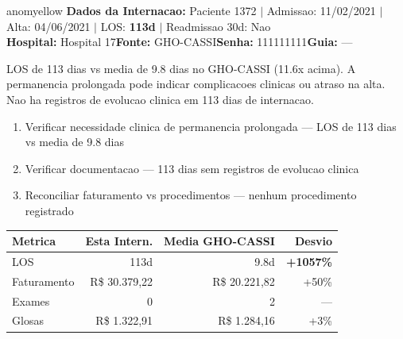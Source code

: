 \documentclass[a4paper,10pt]{article}
\begin{document}
\newpage

\begin{anomalycard}[Internacao 1164 | GHO-CASSI | MODERADO (z=2.21)]{anomyellow}
\textbf{Dados da Internacao:} Paciente 1372 $\mid$ Admissao: 11/02/2021 $\mid$ Alta: 04/06/2021 $\mid$ LOS: \textbf{113d} $\mid$ Readmissao 30d: Nao\\
\textbf{Hospital:} Hospital 17\quad\textbf{Fonte:} GHO-CASSI\quad\textbf{Senha:} 111111111\quad\textbf{Guia:} ---\\
\vspace{2pt}\begin{tcolorbox}[colback=severityred!20,colframe=anomyellow,title={\textbf{Interpretacao de Negocio}},fonttitle=\bfseries\small,left=4pt,right=4pt,top=3pt,bottom=3pt]
{\small LOS de 113 dias vs media de 9.8 dias no GHO-CASSI (11.6x acima). A permanencia prolongada pode indicar complicacoes clinicas ou atraso na alta. Nao ha registros de evolucao clinica em 113 dias de internacao.}
\end{tcolorbox}
\begin{tcolorbox}[colback=severityyellow!30,colframe=anomorange,title={\textbf{Recomendacoes Especificas}},fonttitle=\bfseries\small,left=4pt,right=4pt,top=3pt,bottom=3pt]
\begin{enumerate}[nosep,leftmargin=16pt]
\item {\small Verificar necessidade clinica de permanencia prolongada --- LOS de 113 dias vs media de 9.8 dias}
\item {\small Verificar documentacao --- 113 dias sem registros de evolucao clinica}
\item {\small Reconciliar faturamento vs procedimentos --- nenhum procedimento registrado}
\end{enumerate}
\end{tcolorbox}
\begin{center}\begin{tabular}{l r r r}\toprule\textbf{Metrica} & \textbf{Esta Intern.} & \textbf{Media GHO-CASSI} & \textbf{Desvio} \\\midrule
LOS & 113d & 9.8d & \textcolor{anomred}{\textbf{+1057\%}} \\
Faturamento & R\$ 30.379,22 & R\$ 20.221,82 & \textcolor{anomorange}{+50\%} \\
Exames & 0 & 2 & --- \\
Glosas & R\$ 1.322,91 & R\$ 1.284,16 & +3\% \\
\bottomrule\end{tabular}\end{center}


\end{anomalycard}
\end{document}
